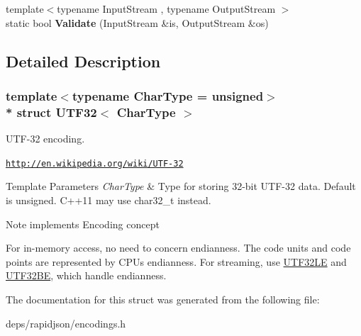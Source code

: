 \begin{DoxyCompactItemize}
\item 
{\footnotesize template$<$typename Input\+Stream , typename Output\+Stream $>$ }\\static bool {\bfseries Validate} (Input\+Stream \&is, Output\+Stream \&os)\hypertarget{struct_u_t_f32_a71336fb0546b3079e01bbd51d2fa2e45}{}\label{struct_u_t_f32_a71336fb0546b3079e01bbd51d2fa2e45}

\end{DoxyCompactItemize}


\subsection{Detailed Description}
\subsubsection*{template$<$typename Char\+Type = unsigned$>$\\*
struct U\+T\+F32$<$ Char\+Type $>$}

U\+T\+F-\/32 encoding. 

\href{http://en.wikipedia.org/wiki/UTF-32}{\tt http\+://en.\+wikipedia.\+org/wiki/\+U\+T\+F-\/32} 
\begin{DoxyTemplParams}{Template Parameters}
{\em Char\+Type} & Type for storing 32-\/bit U\+T\+F-\/32 data. Default is unsigned. C++11 may use char32\+\_\+t instead. \\
\hline
\end{DoxyTemplParams}
\begin{DoxyNote}{Note}
implements Encoding concept

For in-\/memory access, no need to concern endianness. The code units and code points are represented by C\+PU\textquotesingle{}s endianness. For streaming, use \hyperlink{struct_u_t_f32_l_e}{U\+T\+F32\+LE} and \hyperlink{struct_u_t_f32_b_e}{U\+T\+F32\+BE}, which handle endianness. 
\end{DoxyNote}


The documentation for this struct was generated from the following file\+:\begin{DoxyCompactItemize}
\item 
deps/rapidjson/encodings.\+h\end{DoxyCompactItemize}
